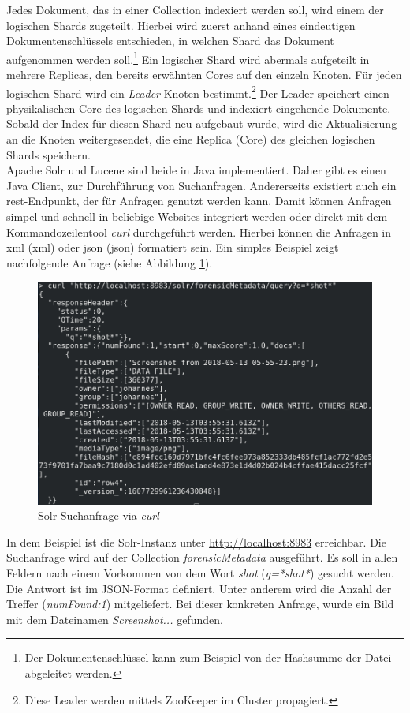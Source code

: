 \noindent
Jedes Dokument, das in einer Collection indexiert werden soll, wird einem der logischen Shards zugeteilt. Hierbei wird zuerst anhand eines eindeutigen Dokumentenschlüssels entschieden, in welchen Shard das Dokument aufgenommen werden soll.\footnote{Der Dokumentenschlüssel kann zum Beispiel von der Hashsumme der Datei abgeleitet werden.} Ein logischer Shard wird abermals aufgeteilt in mehrere Replicas, den bereits erwähnten Cores auf den einzeln Knoten. 
Für jeden logischen Shard wird ein \textit{Leader}-Knoten bestimmt.\footnote{Diese Leader werden mittels ZooKeeper im Cluster propagiert.} Der Leader speichert einen physikalischen Core des logischen Shards und indexiert eingehende Dokumente. Sobald der Index für diesen Shard neu aufgebaut wurde, wird die Aktualisierung an die Knoten weitergesendet, die eine Replica (Core) des gleichen logischen Shards speichern.\cite[S. 867-872]{solr_ref_guide}\\ 


\noindent
Apache Solr und Lucene sind beide in Java implementiert. Daher gibt es einen Java Client, zur Durchführung von Suchanfragen. Andererseits existiert auch ein \gls{rest}-Endpunkt, der für Anfragen genutzt werden kann. Damit können Anfragen simpel und schnell in beliebige Websites integriert werden oder direkt mit dem Kommandozeilentool \textit{curl} durchgeführt werden. Hierbei können die Anfragen in \acrshort{xml} (\acrlong{xml}) oder \acrshort{json} (\acrlong{json}) formatiert sein. Ein simples Beispiel zeigt nachfolgende Anfrage (siehe Abbildung \ref{fig:solr_request}).\\

\begin{figure}[ht]
  \centering
  \includegraphics[width=\textwidth]{./resource/solr_request.png}
  \caption{Solr-Suchanfrage via \textit{curl}}
  \label{fig:solr_request}
\end{figure}

\noindent
In dem Beispiel ist die Solr-Instanz unter \url{http://localhost:8983} erreichbar. Die Suchanfrage wird auf der Collection \textit{forensicMetadata} ausgeführt. Es soll in allen Feldern nach einem Vorkommen von dem Wort \textit{shot} (\textit{q=*shot*}) gesucht werden. Die Antwort ist im JSON-Format definiert. Unter anderem wird die Anzahl der Treffer (\textit{numFound:1}) mitgeliefert. Bei dieser konkreten Anfrage, wurde ein Bild mit dem Dateinamen \textit{Screenshot...} gefunden. 